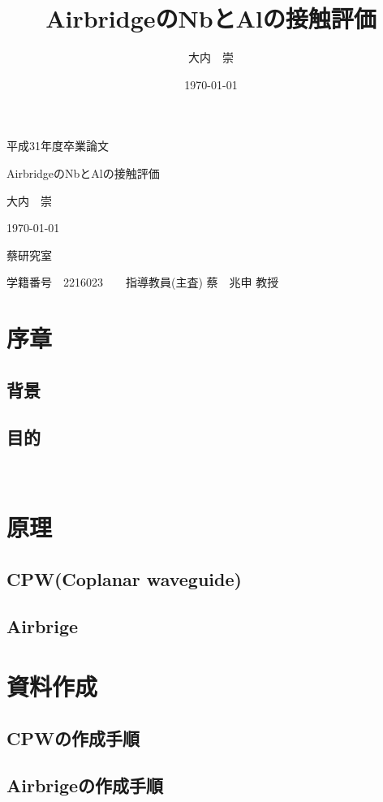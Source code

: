 \documentclass[a4paper,11pt,oneside,openany]{jsbook}
\title{AirbridgeのNbとAlの接触評価}
\author{大内　崇}
\date{\today}
\begin{document}
\begin{center}
  \huge 平成31年度卒業論文\par
  \vspace{15mm}
  \huge AirbridgeのNbとAlの接触評価 \par
  \vspace{15mm}
  \LARGE 大内　崇 \par
  \vspace{100mm}
  \Large \today \par
  \vspace{15mm}
  \Large 蔡研究室 \par
  \vspace{10mm}
  \Large 学籍番号　2216023　　指導教員(主査) 蔡　兆申 教授\par
  \vspace{10mm}
\end{center}
\thispagestyle{empty}
\clearpage
\addtocounter{page}{-1}
\newpage
\setcounter{tocdepth}{3}
%
\tableofcontents
%
\chapter{序章}
\section{背景}
 
\section{目的}
　

\chapter{原理}
\section{CPW(Coplanar waveguide)}
\section{Airbrige}

\chapter{資料作成}
\section{CPWの作成手順}
\section{Airbrigeの作成手順}
\end{document}
